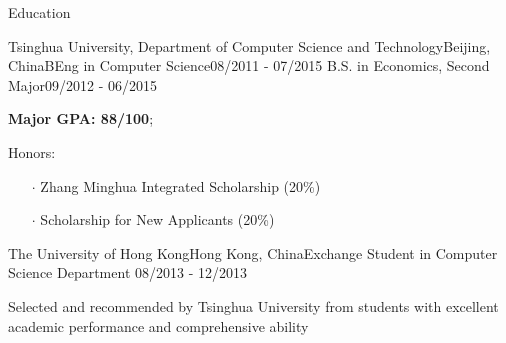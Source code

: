 \documentclass{resume} %
\begin{document}
\vspace{-1.5em}
\begin{rSection}{Education}
\begin{eSubsection}{Tsinghua University, Department of Computer Science and Technology}{Beijing, China}{BEng in Computer Science}{08/2011 - 07/2015}
{B.S. in Economics, Second Major}{09/2012 - 06/2015}
\item \textbf{Major GPA: 88/100};
\item Honors:
\begin{itemize}
\itemsep -0.5em \vspace{-0.5em}
\item[$\cdot$] Zhang Minghua Integrated Scholarship (20\%)
\item[$\cdot$] Scholarship for New Applicants (20\%)
\end{itemize}
\end{eSubsection}
\vspace{-0.8em}
\begin{rSubsection}{The University of Hong Kong}{Hong Kong, China}{Exchange Student in Computer Science Department}{ 08/2013 - 12/2013}
\item Selected and recommended by Tsinghua University from students with excellent academic performance and comprehensive ability
\end{rSubsection}
\end{rSection}
\vspace{-1.0em}
\end{document}
